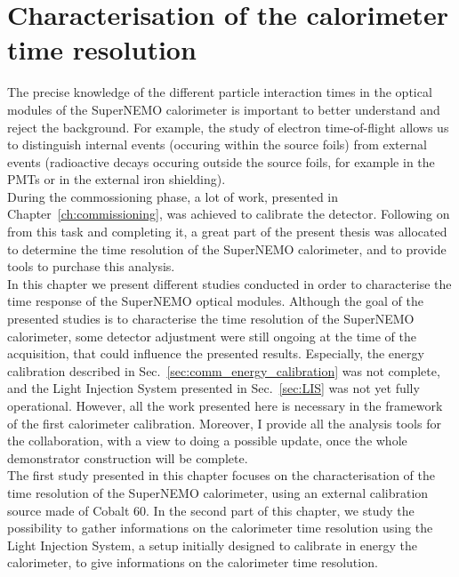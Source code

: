 \chapter{Characterisation of the calorimeter time resolution}

The precise knowledge of the different particle interaction times in the optical modules of the SuperNEMO calorimeter is important to better understand and reject the background.
For example, the study of electron time-of-flight allows us to distinguish internal events (occuring within the source foils) from external events (radioactive decays occuring outside the source foils, for example in the PMTs or in the external iron shielding).\\
\newline
During the commossioning phase, a lot of work, presented in Chapter~\ref{ch:commissioning}, was achieved to calibrate the detector.
Following on from this task and completing it, a great part of the present thesis was allocated to determine the time resolution of the SuperNEMO calorimeter, and to provide tools to purchase this analysis.\\
\newline
In this chapter we present different studies conducted in order to characterise the time response of the SuperNEMO optical modules.
Although the goal of the presented studies is to characterise the time resolution of the SuperNEMO calorimeter, some detector adjustment were still ongoing at the time of the acquisition, that could influence the presented results.
Especially, the energy calibration described in Sec.~\ref{sec:comm_energy_calibration} was not complete, and the Light Injection System presented in Sec.~\ref{sec:LIS} was not yet fully operational.
However, all the work presented here is necessary in the framework of the first calorimeter calibration.
Moreover, I provide all the analysis tools for the collaboration, with a view to doing a possible update, once the whole demonstrator construction will be complete.\\
\newline
The first study presented in this chapter focuses on the characterisation of the time resolution of the SuperNEMO calorimeter, using an external calibration source made of Cobalt $60$.
In the second part of this chapter, we study the possibility to gather informations on the calorimeter time resolution using the Light Injection System, a setup initially designed to calibrate in energy the calorimeter, to give informations on the calorimeter time resolution.

